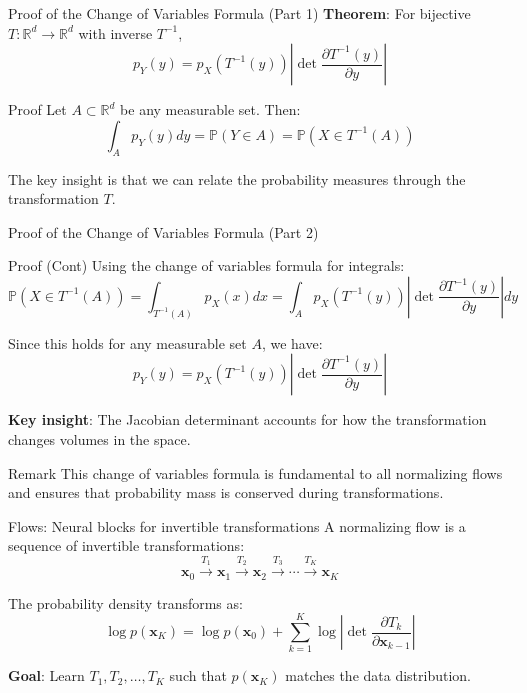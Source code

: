 \documentclass[aspectratio=169]{beamer}
\begin{document}
\begin{frame}{Proof of the Change of Variables Formula (Part 1)}
\textbf{Theorem}: For bijective $T: \mathbb{R}^d \to \mathbb{R}^d$ with inverse $T^{-1}$,
\begin{equation}
    p_Y(y) = p_X(T^{-1}(y)) \left|\det \frac{\partial T^{-1}(y)}{\partial y}\right|
\end{equation}

\begin{block}{Proof}
Let $A \subset \mathbb{R}^d$ be any measurable set. Then:
\begin{equation}
    \int_A p_Y(y) dy = \mathbb{P}(Y \in A) = \mathbb{P}(X \in T^{-1}(A))
\end{equation}

The key insight is that we can relate the probability measures through the transformation $T$.
\end{block}
\end{frame}

\begin{frame}{Proof of the Change of Variables Formula (Part 2)}
\small
\begin{block}{Proof (Cont)}
Using the change of variables formula for integrals:
\begin{equation}
    \mathbb{P}(X \in T^{-1}(A)) = \int_{T^{-1}(A)} p_X(x) dx = \int_A p_X(T^{-1}(y)) \left|\det \frac{\partial T^{-1}(y)}{\partial y}\right| dy
\end{equation}

Since this holds for any measurable set $A$, we have:
\begin{equation}
    p_Y(y) = p_X(T^{-1}(y)) \left|\det \frac{\partial T^{-1}(y)}{\partial y}\right|
\end{equation}

\textbf{Key insight}: The Jacobian determinant accounts for how the transformation changes volumes in the space.
\end{block}

\begin{alertblock}{Remark}
    This change of variables formula is fundamental to all normalizing flows and ensures that probability mass is conserved during transformations.
\end{alertblock}
\end{frame}

\begin{frame}{Flows: Neural blocks for invertible transformations}
A normalizing flow is a sequence of invertible transformations:
\begin{equation}
    \mathbf{x}_0 \xrightarrow{T_1} \mathbf{x}_1 \xrightarrow{T_2} \mathbf{x}_2 \xrightarrow{T_3} \cdots \xrightarrow{T_K} \mathbf{x}_K
\end{equation}

The probability density transforms as:
\begin{equation}
    \log p(\mathbf{x}_K) = \log p(\mathbf{x}_0) + \sum_{k=1}^K \log \left|\det \frac{\partial T_k}{\partial \mathbf{x}_{k-1}}\right|
\end{equation}

\textbf{Goal}: Learn $T_1, T_2, \ldots, T_K$ such that $p(\mathbf{x}_K)$ matches the data distribution.
\end{frame}
\end{document}
